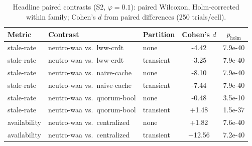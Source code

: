 \begin{table}[t]
\centering\small
\caption{Headline paired contrasts (S2, $\varphi=0.1$): paired Wilcoxon, Holm-corrected within family; Cohen's $d$ from paired differences (250 trials/cell).}
\label{tab:significance}
\begin{tabular}{lllcc}
\toprule
Metric & Contrast & Partition & Cohen's $d$ & $p_{\mathrm{holm}}$ \\
\midrule
stale-rate & neutro-waa vs.\ lww-crdt & none & -4.42 & 7.9e-40 \\
stale-rate & neutro-waa vs.\ lww-crdt & transient & -3.25 & 7.9e-40 \\
stale-rate & neutro-waa vs.\ naive-cache & none & -8.10 & 7.9e-40 \\
stale-rate & neutro-waa vs.\ naive-cache & transient & -7.44 & 7.9e-40 \\
stale-rate & neutro-waa vs.\ quorum-bool & none & -0.48 & 3.5e-10 \\
stale-rate & neutro-waa vs.\ quorum-bool & transient & +1.48 & 1.5e-37 \\
availability & neutro-waa vs.\ centralized & none & +1.82 & 7.6e-40 \\
availability & neutro-waa vs.\ centralized & transient & +12.56 & 7.2e-40 \\
\bottomrule
\end{tabular}
\end{table}
